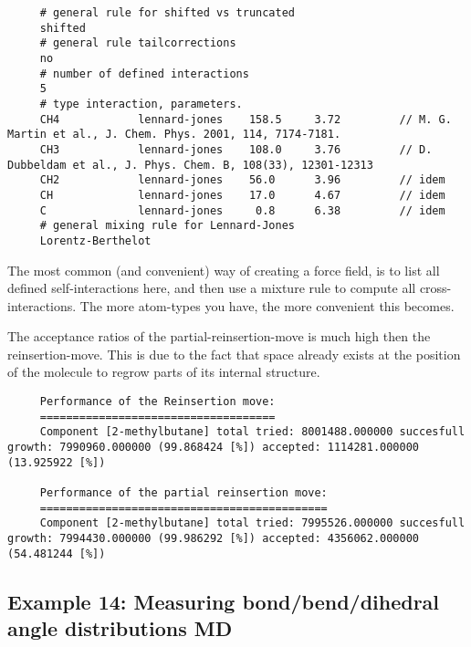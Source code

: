\begin{tiny}
\begin{verbatim}
     # general rule for shifted vs truncated
     shifted
     # general rule tailcorrections
     no
     # number of defined interactions
     5
     # type interaction, parameters.
     CH4            lennard-jones    158.5     3.72         // M. G. Martin et al., J. Chem. Phys. 2001, 114, 7174-7181.
     CH3            lennard-jones    108.0     3.76         // D. Dubbeldam et al., J. Phys. Chem. B, 108(33), 12301-12313
     CH2            lennard-jones    56.0      3.96         // idem
     CH             lennard-jones    17.0      4.67         // idem
     C              lennard-jones     0.8      6.38         // idem
     # general mixing rule for Lennard-Jones
     Lorentz-Berthelot
\end{verbatim}
\end{tiny}
The most common (and convenient) way of creating a force field, is to list all defined self-interactions here, and then use a mixture rule to compute
all cross-interactions. The more atom-types you have, the more convenient this becomes.

The acceptance ratios of the partial-reinsertion-move is much high then the reinsertion-move.
This is due to the fact that space already exists at the position of the molecule to regrow parts of its internal structure.
\begin{tiny}
\begin{verbatim}
     Performance of the Reinsertion move:
     ====================================
     Component [2-methylbutane] total tried: 8001488.000000 succesfull growth: 7990960.000000 (99.868424 [%]) accepted: 1114281.000000 (13.925922 [%])

     Performance of the partial reinsertion move:
     ============================================
     Component [2-methylbutane] total tried: 7995526.000000 succesfull growth: 7994430.000000 (99.986292 [%]) accepted: 4356062.000000 (54.481244 [%])
\end{verbatim}
\end{tiny}

\subsection*{Example 14: Measuring bond/bend/dihedral angle distributions MD}

